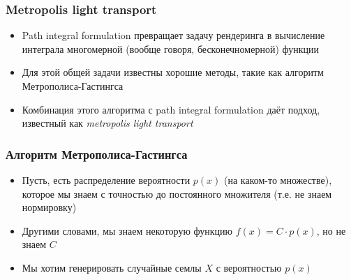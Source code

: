 \documentclass[10pt]{beamer}
\begin{document}
\begin{frame}
\frametitle{Metropolis light transport}
\begin{itemize}
\item Path integral formulation превращает задачу рендеринга в вычисление интеграла многомерной (вообще говоря, бесконечномерной) функции
\pause
\item Для этой общей задачи известны хорошие методы, такие как алгоритм Метрополиса-Гастингса
\pause
\item Комбинация этого алгоритма с path integral formulation даёт подход, известный как \textit{metropolis light transport}
\end{itemize}
\end{frame}

\begin{frame}
\frametitle{Алгоритм Метрополиса-Гастингса}
\begin{itemize}
\item Пусть, есть распределение вероятности \begin{math}p(x)\end{math} (на каком-то множестве), которое мы знаем с точностью до постоянного множителя (т.е. не знаем нормировку)
\pause
\item Другими словами, мы знаем некоторую функцию \begin{math}f(x) = C\cdot p(x)\end{math}, но не знаем \begin{math}C\end{math}
\pause
\item Мы хотим генерировать случайные семлы \begin{math}X\end{math} с вероятностью \begin{math}p(x)\end{math}
\end{itemize}
\end{frame}
\end{document}
